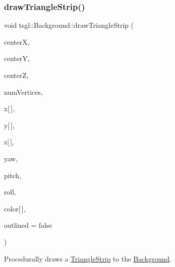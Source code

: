 \subsubsection{\texorpdfstring{draw\+Triangle\+Strip()}{drawTriangleStrip()}\hspace{0.1cm}{\footnotesize\ttfamily [2/2]}}
{\footnotesize\ttfamily void tsgl\+::\+Background\+::draw\+Triangle\+Strip (\begin{DoxyParamCaption}\item[{float}]{centerX,  }\item[{float}]{centerY,  }\item[{float}]{centerZ,  }\item[{int}]{num\+Vertices,  }\item[{float}]{x\mbox{[}$\,$\mbox{]},  }\item[{float}]{y\mbox{[}$\,$\mbox{]},  }\item[{float}]{z\mbox{[}$\,$\mbox{]},  }\item[{float}]{yaw,  }\item[{float}]{pitch,  }\item[{float}]{roll,  }\item[{\hyperlink{structtsgl_1_1_color_float}{Color\+Float}}]{color\mbox{[}$\,$\mbox{]},  }\item[{bool}]{outlined = {\ttfamily false} }\end{DoxyParamCaption})\hspace{0.3cm}{\ttfamily [virtual]}}



Procedurally draws a \hyperlink{classtsgl_1_1_triangle_strip}{Triangle\+Strip} to the \hyperlink{classtsgl_1_1_background}{Background}. 

